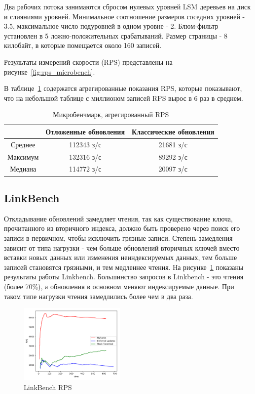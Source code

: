 \documentclass[a4paper,hidelinks,12pt]{article}
\begin{document}
Два рабочих потока занимаются сбросом нулевых уровней LSM деревьев на диск и
слияниями уровней. Минимальное соотношение размеров соседних уровней - 3.5,
максимальное число подуровней в одном уровне - 2. Блюм-фильтр установлен в 5%
ложно-положительных срабатываний. Размер страницы - 8 килобайт, в которые
помещается около 160 записей.

Результаты измерений скорости (RPS) представлены на
рисунке~\ref{fig:rps_microbench}.

В таблице~\ref{table:rps_microbench} содержатся агрегированные показания RPS,
которые показывают, что на небольшой таблице с миллионом записей RPS вырос в 6
раз в среднем.

\begin{table}
\centering
\caption{Микробенчмарк, агрегированный RPS}
\label{table:rps_microbench}
\begin{tabular}{|c|c|c|} \hline
\cellcolor{table_header}&
\cellcolor{table_header}Отложенные обновления &
\cellcolor{table_header}Классические обновления\\ \hline

\cellcolor{table_header}Среднее &112343 з/с &21681 з/с\\ \hline
\cellcolor{table_header}Максимум &132316 з/с &89292 з/с\\ \hline
\cellcolor{table_header}Медиана &114772 з/с &20097 з/с\\
\hline\end{tabular}
\end{table}

\subsection{LinkBench}

Откладывание обновлений замедляет чтения, так как существование ключа,
прочитанного из вторичного индекса, должно быть проверено через поиск его записи
в первичном, чтобы исключить грязные записи. Степень замедления зависит от типа
нагрузки - чем больше обновлений вторичных ключей вместо вставки новых данных
или изменения неиндексируемых данных, тем больше записей становятся грязными,
и тем медленнее чтения. На рисунке~\ref{fig:linkbench} показаны результаты
работы Linkbench. Большинство запросов в Linkbench - это чтения (более 70\%), а
обновления в основном меняют индексируемые данные. При таком типе нагрузки
чтения замедлились более чем в два раза.

\begin{figure}
\centering
\includegraphics[width=0.46\textwidth]{linkbench}
\caption{LinkBench RPS}
\label{fig:linkbench}
\end{figure}
\end{document}
